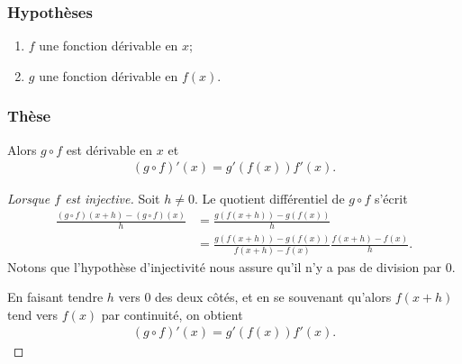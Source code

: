 \documentclass[main.tex]{subfiles}
\begin{document}
\begin{proposition}

    \subsubsection{Hypothèses}

    \begin{enumerate}
        \item $f$ une fonction dérivable en $x$;
        \item $g$ une fonction dérivable en $f(x)$.
    \end{enumerate}

    \subsubsection{Thèse}

    Alors $g \circ f$ est dérivable en $x$ et
    \begin{align}
        (g \circ f)'(x) = g'(f(x)) f'(x).
    \end{align}
\end{proposition}
\begin{proof}[Lorsque $f$ est injective]
    Soit $h \neq 0$.
    Le quotient différentiel de $g \circ f$ s'écrit
    \begin{align}
        \frac {(g \circ f)(x + h) - (g \circ f)(x)} h
        &= \frac {g(f(x + h)) - g(f(x))} h\\
        &= \frac {g(f(x + h)) - g(f(x))} {f(x + h) - f(x)} \frac {f(x + h) - f(x)} h.
    \end{align}
    Notons que l'hypothèse d'injectivité nous assure qu'il n'y a pas de division par $0$.

    En faisant tendre $h$ vers $0$ des deux côtés,
    et en se souvenant qu'alors $f(x + h)$ tend vers $f(x)$ par continuité,
    on obtient
    \begin{align}
        (g \circ f)'(x) = g'(f(x)) f'(x).
    \end{align}
\end{proof}
\end{document}
